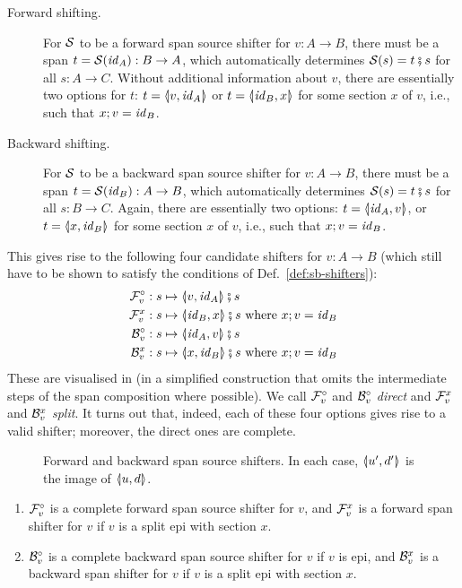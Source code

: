 %
\begin{description}
\item[Forward shifting.] For $\cS$ to be a forward span source shifter for $v:A\to B$, there must be a span $t=\cS(\id_A):B\to A$, which automatically determines $\cS(s)=t\spcomp s$ for all $s:A\to C$. Without additional information about $v$, there are essentially two options for $t$: $t=\spanof{v}{\id_A}$ or $t=\spanof{\id_B}{x}$ for some section $x$ of $v$, i.e., such that $x;v=\id_B$.

\item[Backward shifting.] For $\cS$ to be a backward span source shifter for $v:A\to B$, there must be a span $t=\cS(\id_B):A\to B$, which automatically determines $\cS(s)=t \spcomp s$ for all $s:B\to C$. Again, there are essentially two options: $t=\spanof{\id_A}{v}$, or $t=\spanof{x}{\id_B}$ for some section $x$ of $v$, i.e., such that $x;v=\id_B$.
\end{description}
%
This gives rise to the following four candidate shifters for $v:A\to B$ (which still have to be shown to satisfy the conditions of Def.~\ref{def:sb-shifters}):
%
\begin{align*}
\dF v & : s \mapsto \spanof{v}{\id_A}\spcomp s \\
\rF v x& : s \mapsto \spanof{\id_B}{x}\spcomp s \text{ where $x;v=\id_B$} \\
\dB v& : s \mapsto \spanof{\id_A}{v}\spcomp s \\
\rB v x& : s \mapsto \spanof{x}{\id_B}\spcomp s \text{ where $x;v=\id_B$}
\end{align*}
%
These are visualised in  (in a simplified construction that omits the intermediate steps of the span composition where possible). We call $\dF v$ and $\dB v$ \emph{direct} and $\rF v x$ and $\rB v x$ \emph{split}. It turns out that, indeed, each of these four options gives rise to a valid shifter; moreover, the direct ones are complete.
%
\begin{figure}[t]
\centering

\caption{Forward and backward span source shifters. In each case, $\spanof{u'}{d'}$ is the image of $\spanof{u}{d}$.}
\end{figure}
%
\begin{proposition}
\begin{enumerate}[topsep=\smallskipamount]
\item $\cF_v^\circ$ is a complete forward span source shifter for $v$, and $\cF_v^x$ is a forward span shifter for $v$ if $v$ is a split epi with section $x$.
\item $\cB_v^\circ$ is a complete backward span source shifter for $v$ if $v$ is epi, and $\cB_v^x$ is a backward span shifter for $v$ if $v$ is a split epi with section $x$.
\end{enumerate}
\end{proposition}
